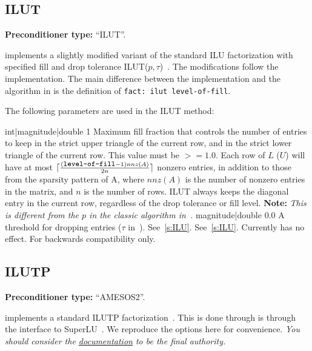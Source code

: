 \subsection{ILUT}\label{s:ILUT}

\textbf{Preconditioner type:} ``ILUT''.

\ifpacktwo{} implements a slightly modified variant of the standard ILU factorization with specified fill and
drop tolerance ILUT($p,\tau$)~\cite{Saad1994}. The modifications follow the \aztecoo implementation.
The main difference between the \ifpacktwo implementation and the algorithm in \cite{Saad1994} is the definition of
\texttt{fact: ilut level-of-fill}.

The following parameters are used in the ILUT method:

    {int|magnitude|double}
    {1}
    {Maximum fill fraction that controls the
     number of entries to keep in the strict upper triangle of the
     current row, and in the strict lower triangle of the current
     row.  This value must be $>= 1.0$.  Each row of $L$ ($U$) will have at most $\lceil\frac{(\mbox{\small\tt
     level-of-fill}-1)nnz(A)}{2n}\rceil$ nonzero entries, in addition to those from the sparsity pattern of A, where $nnz(A)$ is the
     number of nonzero entries in the matrix, and $n$ is the number of rows.
     ILUT always keeps the diagonal entry in the current row, regardless of the
     drop tolerance or fill level. \textbf{Note:} \textit{This is
     different from the $p$ in the classic algorithm in~\cite{Saad1994}.}}
    {magnitude|double}
    {0.0}
    {A threshold for dropping entries ($\tau$ in~\cite{Saad1994}).}
    {See~\ref{s:ILU}.}
    {See~\ref{s:ILU}.}
    {Currently has no effect. For backwards compatibility only.}

\subsection{ILUTP}\label{s:ILUTP}

\textbf{Preconditioner type:} ``AMESOS2''.


\ifpacktwo{} implements a standard ILUTP factorization~\cite{Saad2003}. This is
done through is through the \amesostwo interface to SuperLU~\cite{Li2011}. We
reproduce the \amesostwo options here for convenience. {\em You should consider
the \href{http://trilinos.org/docs/dev/packages/amesos2/doc/html/group__amesos2__solver__parameters.html#superlu_parameters}{\amesostwo
documentation} to be the final authority.}

